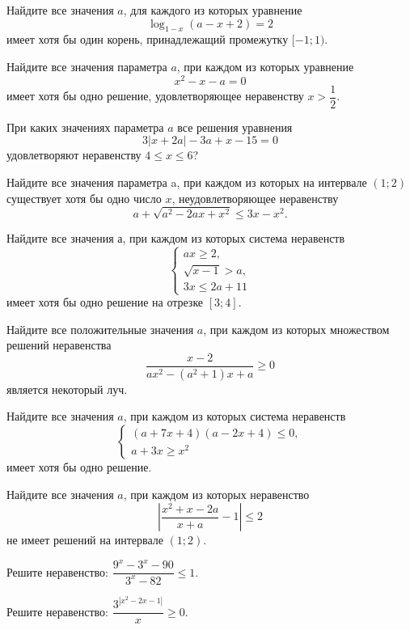\begin{class}[number=3]
\begin{listofex}
	\foranswer
	\item Найдите все значения \( a \), для каждого из которых уравнение \[ \log_{1-x}(a-x+2)=2 \] имеет хотя бы один корень, принадлежащий промежутку \( [-1;1) \).
	\end{listofex}
	\newpage
	\begin{listofex}
	\item Найдите все значения параметра \( a \), при каждом из которых уравнение
	\[ x^2-x-a=0 \]
	имеет хотя бы одно решение, удовлетворяющее неравенству \( x>\dfrac{1}{2} \).
	\item При каких значениях параметра \( a \) все решения уравнения
	\[ 3|x+2a|-3a+x-15=0 \]
	удовлетворяют неравенству \( 4\le x \le 6 \)?
	\item Найдите все значения параметра a, при каждом из которых на интервале \( (1;2) \) существует хотя бы одно число \( x \), неудовлетворяющее неравенству
	\[ a + \sqrt{a^2-2ax+x^2}\le3x-x^2. \]
	\item Найдите все значения \( а \), при каждом из которых система неравенств
	\[ \left\{
	\begin{array}{l}
		ax\ge2,\\
		\sqrt{x-1}>a,\\
		3x\le2a+11
	\end{array}
	\right. \]
	имеет хотя бы одно решение на отрезке \( [3;4] \).
	\item Найдите все положительные значения \( a \), при каждом из которых множеством решений неравенства
	\[ \dfrac{x-2}{ax^2-(a^2+1)x+a}\ge0 \]
	является некоторый луч.
	\end{listofex}
\end{class}

\begin{class}[number=4]
	\begin{listofex}
		\item Найдите все значения \( a \), при каждом из которых система неравенств
		\[ \left\{
		\begin{array}{l}
			(a+7x+4)(a-2x+4)\le0,\\
			a+3x\ge x^2
		\end{array}
		\right. \]
		имеет хотя бы одно решение.
		\item Найдите все значения \( a \), при каждом из которых неравенство
		\[ \left|\dfrac{x^2+x-2a}{x+a}-1\right|\le2 \]
		не имеет решений на интервале \( (1;2) \).
		\item Решите неравенство: \( \dfrac{9^x-3^x-90}{3^x-82}\le1 \).
		\item Решите неравенство: \( \dfrac{3^{|x^2-2x-1|}}{x}\ge0 \).
	\end{listofex}
\end{class}

